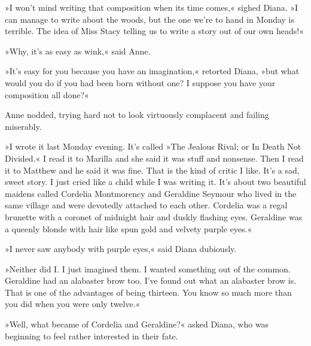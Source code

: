 »I won’t mind writing that composition when its time comes,« sighed Diana. »I can manage to write about the woods, but the one we’re to hand in Monday is terrible. The idea of Miss Stacy telling us to write a story out of our own heads!«

»Why, it’s as easy as wink,« said Anne.

»It’s easy for you because you have an imagination,« retorted Diana, »but what would you do if you had been born without one? I suppose you have your composition all done?«

Anne nodded, trying hard not to look virtuously complacent and failing miserably.

»I wrote it last Monday evening. It’s called »The Jealous Rival; or In Death Not Divided.« I read it to Marilla and she said it was stuff and nonsense. Then I read it to Matthew and he said it was fine. That is the kind of critic I like. It’s a sad, sweet story. I just cried like a child while I was writing it. It’s about two beautiful maidens called Cordelia Montmorency and Geraldine Seymour who lived in the same village and were devotedly attached to each other. Cordelia was a regal brunette with a coronet of midnight hair and duskly flashing eyes. Geraldine was a queenly blonde with hair like spun gold and velvety purple eyes.«

»I never saw anybody with purple eyes,« said Diana dubiously.

»Neither did I. I just imagined them. I wanted something out of the common. Geraldine had an alabaster brow too. I’ve found out what an alabaster brow is. That is one of the advantages of being thirteen. You know so much more than you did when you were only twelve.«

»Well, what became of Cordelia and Geraldine?« asked Diana, who was beginning to feel rather interested in their fate.

